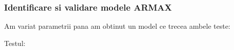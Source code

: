 \documentclass[12pt,english]{article}
\begin{document}
\subsubsection {Identificare si validare modele ARMAX}
Am variat parametrii pana am obtinut un model ce trecea ambele teste:
\begin{center}
\end{center}
\begin{center}
\end{center}

Testul:
\begin{center}
\end{center}
\end{document}
